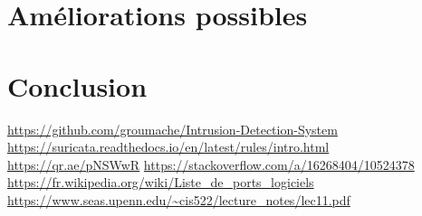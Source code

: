 \documentclass[a4paper]{article}
\begin{document}










\section{Améliorations possibles}













\section{Conclusion}


















\newpage \tableofcontents \listoffigures
\begin{thebibliography}{9}
 {\small \url{https://github.com/groumache/Intrusion-Detection-System}}
 {\small \url{https://suricata.readthedocs.io/en/latest/rules/intro.html}}
 {\small \url{https://qr.ae/pNSWwR}}
 {\small \url{https://stackoverflow.com/a/16268404/10524378}}
 {\small \url{https://fr.wikipedia.org/wiki/Liste_de_ports_logiciels}}
 {\small \url{https://www.seas.upenn.edu/~cis522/lecture_notes/lec11.pdf}}
\end{thebibliography}
\end{document}
